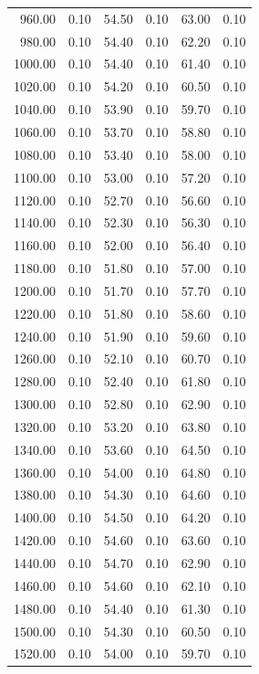 \documentclass[a4paper,11pt]{article}
\begin{document}
\begin{longtable}{rrrrrr}
    960.00 & 0.10 & 54.50 & 0.10 & 63.00 & 0.10 \\
    980.00 & 0.10 & 54.40 & 0.10 & 62.20 & 0.10 \\
    1000.00 & 0.10 & 54.40 & 0.10 & 61.40 & 0.10 \\
    1020.00 & 0.10 & 54.20 & 0.10 & 60.50 & 0.10 \\
    1040.00 & 0.10 & 53.90 & 0.10 & 59.70 & 0.10 \\
    1060.00 & 0.10 & 53.70 & 0.10 & 58.80 & 0.10 \\
    1080.00 & 0.10 & 53.40 & 0.10 & 58.00 & 0.10 \\
    1100.00 & 0.10 & 53.00 & 0.10 & 57.20 & 0.10 \\
    1120.00 & 0.10 & 52.70 & 0.10 & 56.60 & 0.10 \\
    1140.00 & 0.10 & 52.30 & 0.10 & 56.30 & 0.10 \\
    1160.00 & 0.10 & 52.00 & 0.10 & 56.40 & 0.10 \\
    1180.00 & 0.10 & 51.80 & 0.10 & 57.00 & 0.10 \\
    1200.00 & 0.10 & 51.70 & 0.10 & 57.70 & 0.10 \\
    1220.00 & 0.10 & 51.80 & 0.10 & 58.60 & 0.10 \\
    1240.00 & 0.10 & 51.90 & 0.10 & 59.60 & 0.10 \\
    1260.00 & 0.10 & 52.10 & 0.10 & 60.70 & 0.10 \\
    1280.00 & 0.10 & 52.40 & 0.10 & 61.80 & 0.10 \\
    1300.00 & 0.10 & 52.80 & 0.10 & 62.90 & 0.10 \\
    1320.00 & 0.10 & 53.20 & 0.10 & 63.80 & 0.10 \\
    1340.00 & 0.10 & 53.60 & 0.10 & 64.50 & 0.10 \\
    1360.00 & 0.10 & 54.00 & 0.10 & 64.80 & 0.10 \\
    1380.00 & 0.10 & 54.30 & 0.10 & 64.60 & 0.10 \\
    1400.00 & 0.10 & 54.50 & 0.10 & 64.20 & 0.10 \\
    1420.00 & 0.10 & 54.60 & 0.10 & 63.60 & 0.10 \\
    1440.00 & 0.10 & 54.70 & 0.10 & 62.90 & 0.10 \\
    1460.00 & 0.10 & 54.60 & 0.10 & 62.10 & 0.10 \\
    1480.00 & 0.10 & 54.40 & 0.10 & 61.30 & 0.10 \\
    1500.00 & 0.10 & 54.30 & 0.10 & 60.50 & 0.10 \\
    1520.00 & 0.10 & 54.00 & 0.10 & 59.70 & 0.10 \\

\end{longtable}
\end{document}
